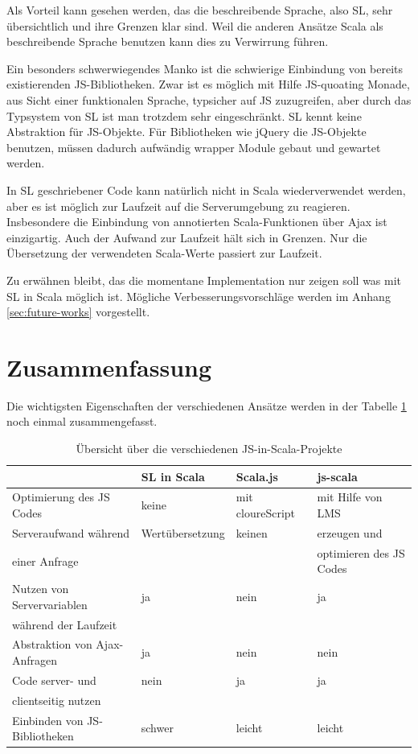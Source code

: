 \documentclass[12pt,bibtotoc]{scrreprt}
\begin{document}
Als Vorteil kann gesehen werden, das die beschreibende Sprache, also SL, sehr übersichtlich und ihre Grenzen klar sind. Weil die anderen Ansätze Scala als beschreibende Sprache benutzen kann dies zu Verwirrung führen. 

Ein besonders schwerwiegendes Manko ist die schwierige Einbindung von bereits existierenden JS-Bibliotheken. Zwar ist es möglich mit Hilfe JS-quoating Monade, aus Sicht einer funktionalen Sprache, typsicher auf JS zuzugreifen, aber durch das Typsystem von SL ist man trotzdem sehr eingeschränkt. SL kennt keine Abstraktion für JS-Objekte. Für Bibliotheken wie jQuery die JS-Objekte benutzen, müssen dadurch aufwändig wrapper Module gebaut und gewartet werden. 

In SL geschriebener Code kann natürlich nicht in Scala wiederverwendet werden, aber es ist möglich zur Laufzeit auf die Serverumgebung zu reagieren. Insbesondere die Einbindung von annotierten Scala-Funktionen über Ajax ist einzigartig. Auch der Aufwand zur Laufzeit hält sich in Grenzen. Nur die Übersetzung der verwendeten Scala-Werte passiert zur Laufzeit.

Zu erwähnen bleibt, das die momentane Implementation nur zeigen soll was mit SL in Scala möglich ist. Mögliche Verbesserungsvorschläge werden im Anhang \ref{sec:future-works} vorgestellt.

\section{Zusammenfassung}

Die wichtigsten Eigenschaften der verschiedenen Ansätze werden in der Tabelle \ref{tab:related-work-overview} noch einmal zusammengefasst.

\begin{table}[ht]
\caption{Übersicht über die verschiedenen JS-in-Scala-Projekte}
\centering
\begin{tabular}{llll}
      & SL in Scala &  Scala.js              &    js-scala \\
\midrule
Optimierung des JS Codes  &  keine  &  mit cloureScript & mit Hilfe von LMS\\
\addlinespace
Serveraufwand während & Wertübersetzung & keinen & erzeugen und  \\
einer Anfrage &  & & optimieren des JS Codes\\
\addlinespace
Nutzen von Servervariablen  & ja & nein & ja \\
während der Laufzeit & \\
\addlinespace
Abstraktion von Ajax-Anfragen & ja & nein & nein \\
\addlinespace
Code server- und & nein & ja & ja \\
clientseitig nutzen \\
\addlinespace
Einbinden von JS-Bibliotheken & schwer & leicht & leicht \\

\end{tabular}
\label{tab:related-work-overview}
\end{table}
\end{document}

